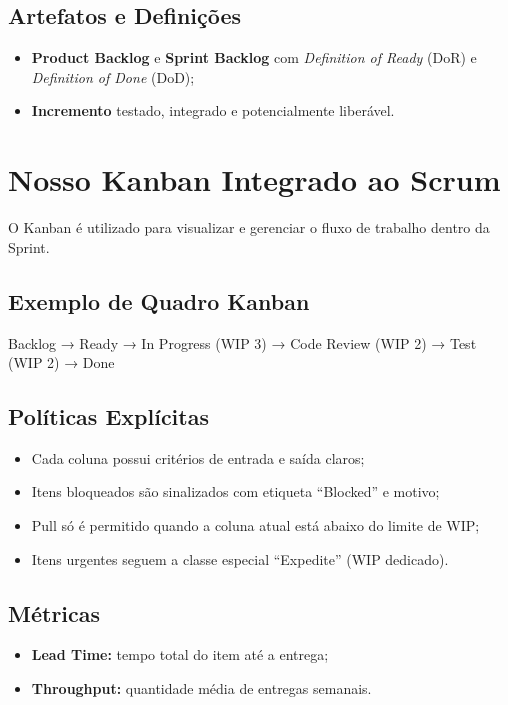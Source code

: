 \documentclass{article}
\begin{document}
\subsection*{Artefatos e Definições}
\begin{itemize}[noitemsep]
    \item \textbf{Product Backlog} e \textbf{Sprint Backlog} com \textit{Definition of Ready} (DoR) e \textit{Definition of Done} (DoD);
    \item \textbf{Incremento} testado, integrado e potencialmente liberável.
\end{itemize}

\section{Nosso Kanban Integrado ao Scrum}

O Kanban é utilizado para visualizar e gerenciar o fluxo de trabalho dentro da Sprint.

\subsection*{Exemplo de Quadro Kanban}
\begin{center}
Backlog → Ready → In Progress (WIP 3) → Code Review (WIP 2) → Test (WIP 2) → Done
\end{center}

\subsection*{Políticas Explícitas}
\begin{itemize}[noitemsep]
    \item Cada coluna possui critérios de entrada e saída claros;
    \item Itens bloqueados são sinalizados com etiqueta “Blocked” e motivo;
    \item Pull só é permitido quando a coluna atual está abaixo do limite de WIP;
    \item Itens urgentes seguem a classe especial “Expedite” (WIP dedicado).
\end{itemize}

\subsection*{Métricas}
\begin{itemize}[noitemsep]
    \item \textbf{Lead Time:} tempo total do item até a entrega;
    \item \textbf{Throughput:} quantidade média de entregas semanais.
\end{itemize}
\end{document}
